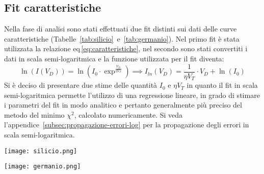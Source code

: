 \documentclass[@SRC@/main]{subfiles}
\begin{document}
    \subsection{Fit caratteristiche}
    Nella fase di analisi sono stati effettuati due fit distinti sui dati delle curve
    caratteristiche (Tabelle~\ref{tab:silicio}~e~\ref{tab:germanio}).
    Nel primo fit è stata utilizzata la relazione eq\,\eqref{eq:caratteristiche}, nel secondo sono stati convertiti i dati in
    scala semi-logaritmica e la funzione utilizzata per il fit diventa:
    \vspace{0.5cm}
    \begin{equation*}
        \ln  (I(V_D)) = \ln \left( I_0 \cdot \exp^{\frac{V_D}{\eta V_T}} \right) \implies
        I_{ln}(V_D) = \frac{1}{\eta V_T} \cdot V_D + \ln (I_0)
    \end{equation*}
    \newpage
    \noindent Si è deciso di presentare due stime delle quantità $I_{0}$ e $\eta V_{T}$
    in quanto il fit in scala semi-logaritmica
    permette l'utilizzo di una regressione lineare, in grado di stimare i parametri del fit in modo analitico e
    pertanto
    generalmente più preciso del metodo del minimo $\chi^2$, calcolato numericamente.
    Si veda l'appendice~\ref{subsec:propagazione-errori-log} per la propagazione degli
    errori in scala semi-logaritmica.
    \vspace{4pt}
    \newline
    \begin{center}
        \begin{minipage}{.95\textwidth}
            \centering
            \texttt{[image: silicio.png]}
            \label{fig:silicio}
        \end{minipage}
    \end{center}
    \vspace{0.5pt}
    \begin{center}
        \begin{minipage}[t]{.95\textwidth}
            \centering
            \texttt{[image: germanio.png]}
            \label{fig:germanio}
        \end{minipage}
    \end{center}
    \vspace{1.5cm}
\end{document}
